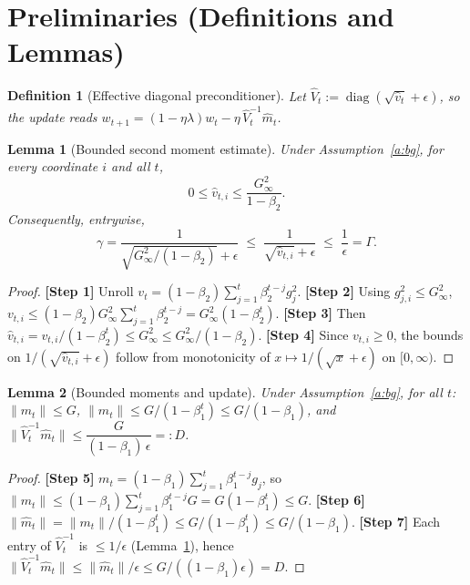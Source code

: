 \documentclass[11pt]{article}
\newtheorem{lemma}{Lemma}
\newtheorem{definition}{Definition}
\begin{document}
\section*{Preliminaries (Definitions and Lemmas)}
\begin{definition}[Effective diagonal preconditioner]
Let $\hat V_t := \operatorname{diag}(\sqrt{\hat v_t}+\epsilon)$, so the update reads
$w_{t+1} = (1-\eta\lambda)w_t - \eta\,\hat V_t^{-1}\hat m_t$.
\end{definition}

\begin{lemma}[Bounded second moment estimate]\label{lem:vbound}
Under Assumption~\ref{a:bg}, for every coordinate $i$ and all $t$,
\[
0 \le \hat v_{t,i} \le \frac{G_\infty^2}{1-\beta_2}.
\]
Consequently, entrywise,
\[
\gamma=\frac{1}{\sqrt{G_\infty^2/(1-\beta_2)}+\epsilon}
\;\le\; \frac{1}{\sqrt{\hat v_{t,i}}+\epsilon}
\;\le\; \frac{1}{\epsilon}=\Gamma.
\]
\end{lemma}
\begin{proof}
\textbf{[Step 1]} Unroll $v_t=(1-\beta_2)\sum_{j=1}^t \beta_2^{t-j} g_j^2$.
\textbf{[Step 2]} Using $g_{j,i}^2 \le G_\infty^2$,
$v_{t,i}\le (1-\beta_2)G_\infty^2\sum_{j=1}^t\beta_2^{t-j}= G_\infty^2(1-\beta_2^t)$.
\textbf{[Step 3]} Then $\hat v_{t,i}=v_{t,i}/(1-\beta_2^t)\le G_\infty^2
\le G_\infty^2/(1-\beta_2)$.
\textbf{[Step 4]} Since $v_{t,i}\ge0$, the bounds on $1/(\sqrt{\hat v_{t,i}}+\epsilon)$
follow from monotonicity of $x\mapsto 1/(\sqrt x+\epsilon)$ on $[0,\infty)$.
\end{proof}

\begin{lemma}[Bounded moments and update]\label{lem:upd}
Under Assumption~\ref{a:bg}, for all $t$:
$\|m_t\|\le G$, $\|\hat m_t\|\le G/(1-\beta_1^t)\le G/(1-\beta_1)$, and
$\|\hat V_t^{-1}\hat m_t\| \le \dfrac{G}{(1-\beta_1)\,\epsilon}=:D$.
\end{lemma}
\begin{proof}
\textbf{[Step 5]} $m_t=(1-\beta_1)\sum_{j=1}^t\beta_1^{t-j}g_j$, so
$\|m_t\|\le(1-\beta_1)\sum_{j=1}^t\beta_1^{t-j}G = G(1-\beta_1^t)\le G$.
\textbf{[Step 6]} $\|\hat m_t\| = \|m_t\|/(1-\beta_1^t)\le G/(1-\beta_1^t)\le G/(1-\beta_1)$.
\textbf{[Step 7]} Each entry of $\hat V_t^{-1}$ is $\le 1/\epsilon$
(Lemma~\ref{lem:vbound}), hence
$\|\hat V_t^{-1}\hat m_t\|\le \|\hat m_t\|/\epsilon \le G/((1-\beta_1)\epsilon)=D$.
\end{proof}
\end{document}
